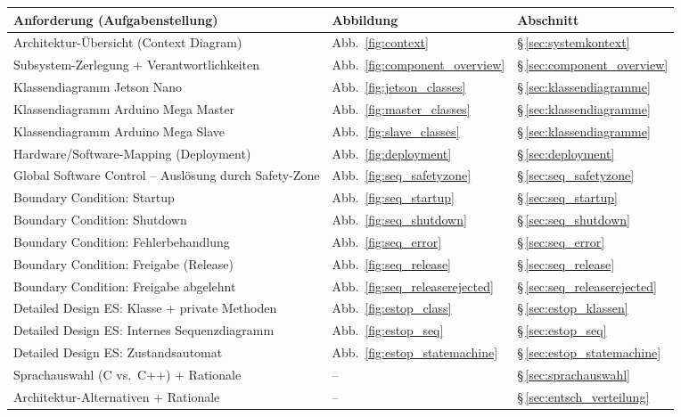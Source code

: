 \begin{longtable}{p{7.5cm} p{2cm} p{3cm}}
  \toprule
  \textbf{Anforderung (Aufgabenstellung)} &
  \textbf{Abbildung} &
  \textbf{Abschnitt} \\
  \midrule
  \endhead
  Architektur-Übersicht (Context Diagram)
    & Abb.~\ref{fig:context}
    & \S\,\ref{sec:systemkontext} \\
  Subsystem-Zerlegung + Verantwortlichkeiten
    & Abb.~\ref{fig:component_overview}
    & \S\,\ref{sec:component_overview} \\
  Klassendiagramm Jetson Nano
    & Abb.~\ref{fig:jetson_classes}
    & \S\,\ref{sec:klassendiagramme} \\
  Klassendiagramm Arduino Mega Master
    & Abb.~\ref{fig:master_classes}
    & \S\,\ref{sec:klassendiagramme} \\
  Klassendiagramm Arduino Mega Slave
    & Abb.~\ref{fig:slave_classes}
    & \S\,\ref{sec:klassendiagramme} \\
  Hardware/Software-Mapping (Deployment)
    & Abb.~\ref{fig:deployment}
    & \S\,\ref{sec:deployment} \\
  Global Software Control – Auslösung durch Safety-Zone
    & Abb.~\ref{fig:seq_safetyzone}
    & \S\,\ref{sec:seq_safetyzone} \\
  Boundary Condition: Startup
    & Abb.~\ref{fig:seq_startup}
    & \S\,\ref{sec:seq_startup} \\
  Boundary Condition: Shutdown
    & Abb.~\ref{fig:seq_shutdown}
    & \S\,\ref{sec:seq_shutdown} \\
  Boundary Condition: Fehlerbehandlung
    & Abb.~\ref{fig:seq_error}
    & \S\,\ref{sec:seq_error} \\
  Boundary Condition: Freigabe (Release)
    & Abb.~\ref{fig:seq_release}
    & \S\,\ref{sec:seq_release} \\
  Boundary Condition: Freigabe abgelehnt
    & Abb.~\ref{fig:seq_releaserejected}
    & \S\,\ref{sec:seq_releaserejected} \\
  Detailed Design \acs{ES}: Klasse + private Methoden
    & Abb.~\ref{fig:estop_class}
    & \S\,\ref{sec:estop_klassen} \\
  Detailed Design \acs{ES}: Internes Sequenzdiagramm
    & Abb.~\ref{fig:estop_seq}
    & \S\,\ref{sec:estop_seq} \\
  Detailed Design \acs{ES}: Zustandsautomat
    & Abb.~\ref{fig:estop_statemachine}
    & \S\,\ref{sec:estop_statemachine} \\
  Sprachauswahl (C vs.\ C++) + Rationale
    & –
    & \S\,\ref{sec:sprachauswahl} \\
  Architektur-Alternativen + Rationale
    & –
    & \S\,\ref{sec:entsch_verteilung} \\
  \bottomrule
\end{longtable}
